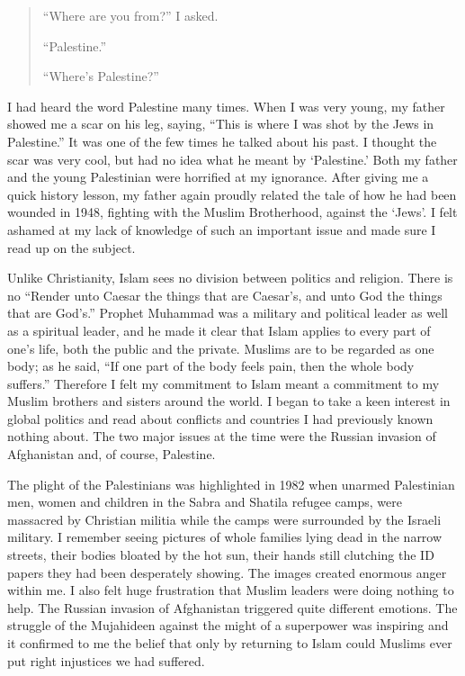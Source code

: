 \documentclass[12pt]{memoir}
\begin{document}
\begin{quote}
“Where are you from?” I asked.

“Palestine.”

“Where’s Palestine?”
\end{quote}

I had heard the word Palestine many times.
When I was very young, my father showed me a scar on his leg, saying,
“This is where I was shot by the Jews in Palestine.”
It was one of the few times he talked about his past.
I thought the scar was very cool,
but had no idea what he meant by ‘Palestine.’
Both my father and the young Palestinian were horrified at my ignorance.
After giving me a quick history lesson,
my father again proudly related the tale of how he had been wounded in 1948,
fighting with the Muslim Brotherhood, against the ‘Jews’.
I felt ashamed at my lack of knowledge of such an important issue
and made sure I read up on the subject.

Unlike Christianity, Islam sees no division between politics and religion.
There is no “Render unto Caesar the things that are Caesar’s,
and unto God the things that are God’s.”
Prophet Muhammad was a military and political leader
as well as a spiritual leader,
and he made it clear that Islam applies to every part of one’s life,
both the public and the private.
Muslims are to be regarded as one body; as he said,
“If one part of the body feels pain, then the whole body suffers.”
Therefore I felt my commitment to Islam meant a commitment
to my Muslim brothers and sisters around the world.
I began to take a keen interest in global politics
and read about conflicts and countries I had previously known nothing about.
The two major issues at the time were the Russian invasion
of Afghanistan and, of course, Palestine.

The plight of the Palestinians was highlighted in 1982
when unarmed Palestinian men, women and children
in the Sabra and Shatila refugee camps,
were massacred by Christian militia while the camps
were surrounded by the Israeli military.
I remember seeing pictures of whole families lying dead in the narrow streets,
their bodies bloated by the hot sun,
their hands still clutching the ID papers they had been desperately showing.
The images created enormous anger within me.
I also felt huge frustration that Muslim leaders were doing nothing to help.
The Russian invasion of Afghanistan triggered quite different emotions.
The struggle of the Mujahideen against the might of a superpower
was inspiring and it confirmed to me the belief
that only by returning to Islam could Muslims
ever put right injustices we had suffered.
\end{document}
